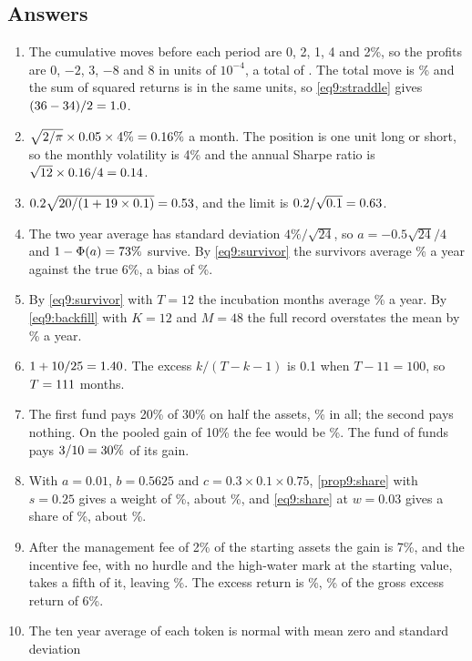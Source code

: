 \begin{chapterrefs}
\subsection*{Answers}
\begin{enumerate}[label=\textbf{9.\arabic*}, leftmargin=*]
  \item The cumulative moves before each period are 0, 2, 1, 4 and 2\%, so the profits are $0$, $-2$, $3$,
  $-8$ and $8$ in units of $10^{-4}$, a total of \exAPnl. The total move is \exAS\% and the sum of squared
  returns is \exAQ{} in the same units, so \cref{eq9:straddle} gives $(36-34)/2=1.0$.
  \item $\sqrt{2/\pi}\times0.05\times4\%=0.16\%$ a month. The position is one unit long or short, so the
  monthly volatility is 4\% and the annual Sharpe ratio is $\sqrt{12}\times0.16/4=0.14$.
  \item $0.2\sqrt{20/(1+19\times0.1)}=0.53$, and the limit is $0.2/\sqrt{0.1}=0.63$.
  \item The two year average has standard deviation $4\%/\sqrt{24}$, so $a=-0.5\sqrt{24}/4$ and
  $1-\Phi(a)=73\%$ survive. By \cref{eq9:survivor} the survivors average \exDMean\% a year against the
  true 6\%, a bias of \exDBias\%.
  \item By \cref{eq9:survivor} with $T=12$ the incubation months average \exEInc\% a year. By
  \cref{eq9:backfill} with $K=12$ and $M=48$ the full record overstates the mean by \exEBias\% a year.
  \item $1+10/25=1.40$. The excess $k/(T-k-1)$ is 0.1 when $T-11=100$, so $T=111$ months.
  \item The first fund pays 20\% of 30\% on half the assets, \exGFee\% in all; the second pays nothing.
  On the pooled gain of 10\% the fee would be \exGNet\%. The fund of funds pays $3/10=30\%$ of its gain.
  \item With $a=0.01$, $b=0.5625$ and $c=0.3\times0.1\times0.75$, \cref{prop9:share} with $s=0.25$ gives a weight
  of \exHWx\%, about \exHW\%, and \cref{eq9:share} at $w=0.03$ gives a share of \exHSharex\%, about \exHShare\%.
  \item After the management fee of 2\% of the starting assets the gain is 7\%, and the incentive fee,
  with no hurdle and the high-water mark at the starting value, takes a fifth of it, leaving \exINet\%.
  The excess return is \exINetEx\%, \exIRatio\% of the gross excess return of 6\%.
  \item The ten year average of each token is normal with mean zero and standard deviation

\end{enumerate}
\end{chapterrefs}
